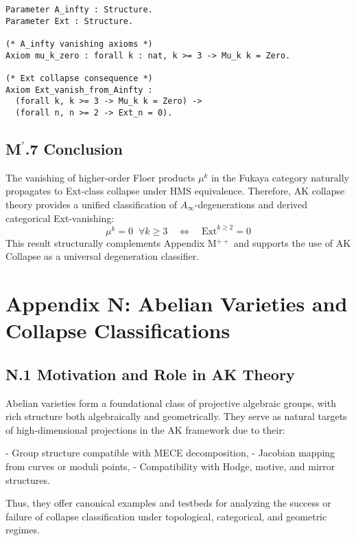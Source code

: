 \documentclass[11pt]{article}
\begin{document}
\begin{axiom}
\begin{axiom}
{{\begin{lstlisting}[language=Coq]
Parameter A_infty : Structure.
Parameter Ext : Structure.

(* A_infty vanishing axioms *)
Axiom mu_k_zero : forall k : nat, k >= 3 -> Mu_k k = Zero.

(* Ext collapse consequence *)
Axiom Ext_vanish_from_Ainfty :
  (forall k, k >= 3 -> Mu_k k = Zero) ->
  (forall n, n >= 2 -> Ext_n = 0).
\end{lstlisting}

\subsection*{M$^\prime$.7 Conclusion}

The vanishing of higher-order Floer products \( \mu^k \) in the Fukaya category naturally propagates to Ext-class collapse under HMS equivalence.  
Therefore, AK collapse theory provides a unified classification of \( A_\infty \)-degenerations and derived categorical Ext-vanishing:
\[
\boxed{
\mu^k = 0 \;\; \forall k \geq 3 \quad \Leftrightarrow \quad \mathrm{Ext}^{k \geq 2} = 0
}
\]
This result structurally complements Appendix M$^{++}$ and supports the use of AK Collapse as a universal degeneration classifier.




\section*{Appendix N: Abelian Varieties and Collapse Classifications}

\subsection*{N.1 Motivation and Role in AK Theory}

Abelian varieties form a foundational class of projective algebraic groups, with rich structure both algebraically and geometrically.  
They serve as natural targets of high-dimensional projections in the AK framework due to their:

- Group structure compatible with MECE decomposition,
- Jacobian mapping from curves or moduli points,
- Compatibility with Hodge, motive, and mirror structures.

Thus, they offer canonical examples and testbeds for analyzing the success or failure of collapse classification under topological, categorical, and geometric regimes.

}}
\end{axiom}
\end{axiom}
\end{document}
